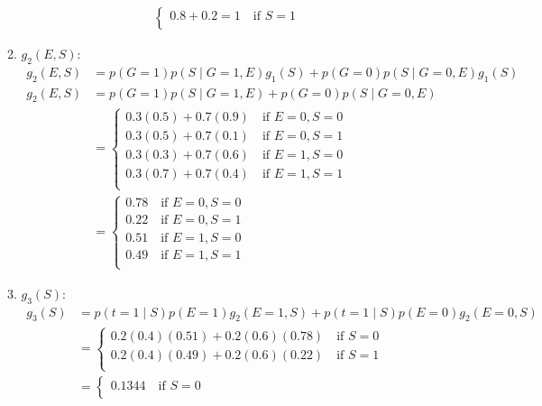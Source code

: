 \begin{example}
\begin{enumerate}
\begin{enumerate}
\begin{align*}
\begin{cases}
                    0.8 + 0.2 = 1 \quad \text{if } S=1 \\
                \end{cases} 
            \end{align*}
            \item $g_2(E,S)$: 
            \begin{align*}
                g_2(E,S) &= p(G=1) p(S \mid G=1,E) g_1(S) + p(G=0) p(S \mid G=0,E) g_1(S) \\
                g_2(E,S) &= p(G=1) p(S \mid G=1,E) + p(G=0) p(S \mid G=0,E) \\
                &= \begin{cases}
                    0.3(0.5) + 0.7(0.9) \quad \text{if } E=0, S=0 \\
                    0.3(0.5) + 0.7(0.1) \quad \text{if } E=0, S=1 \\
                    0.3(0.3) + 0.7(0.6) \quad \text{if } E=1, S=0 \\
                    0.3(0.7) + 0.7(0.4) \quad \text{if } E=1, S=1 \\
                \end{cases} \\
                &= \begin{cases}
                    0.78 \quad \text{if } E=0, S=0 \\
                    0.22 \quad \text{if } E=0, S=1 \\
                    0.51 \quad \text{if } E=1, S=0 \\
                    0.49 \quad \text{if } E=1, S=1 \\
                \end{cases}
            \end{align*}
            \item $g_3(S)$: 
            \begin{align*}
                g_3(S) &= p(t=1 \mid S) p(E=1) g_2(E=1,S) + p(t=1 \mid S) p(E=0) g_2(E=0,S) \\
                &= \begin{cases}
                    0.2(0.4)(0.51) + 0.2(0.6)(0.78) \quad \text{if } S=0 \\
                    0.2(0.4)(0.49) + 0.2(0.6)(0.22) \quad \text{if } S=1 \\
                \end{cases} \\
                &= \begin{cases}
                    0.1344 \quad \text{if } S=0 \\

\end{cases}
\end{align*}
\end{enumerate}
\end{enumerate}
\end{example}
